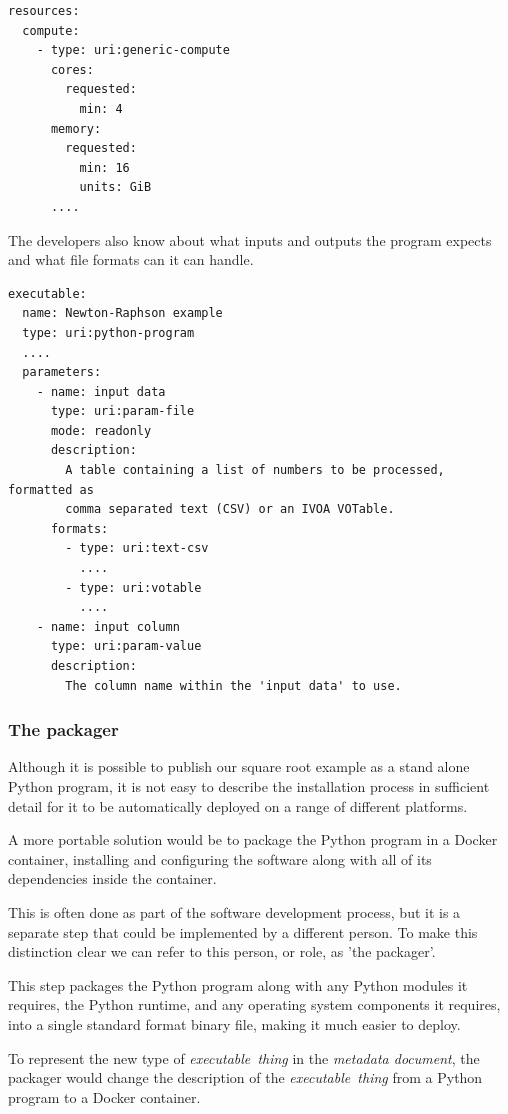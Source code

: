 \documentclass[11pt,a4paper]{ivoa}
\newcommand{\executablething}[1] {\textit{executable~thing#1}}
\newcommand{\metadoc} [1]{\textit{metadata document#1}}
\newcommand{\python} {Python}
\newcommand{\pythonprogram} {Python program}
\newcommand{\pythonruntime} {Python runtime}
\newcommand{\dockercontainer} {Docker container}
\begin{document}
\begin{lstlisting}[]
resources:
  compute:
    - type: uri:generic-compute
      cores:
        requested:
          min: 4
      memory:
        requested:
          min: 16
          units: GiB
      ....
\end{lstlisting}

The developers also know about what inputs and outputs the program expects and what file
formats can it can handle.

\begin{lstlisting}[]
executable:
  name: Newton-Raphson example
  type: uri:python-program
  ....
  parameters:
    - name: input data
      type: uri:param-file
      mode: readonly
      description:
        A table containing a list of numbers to be processed, formatted as
        comma separated text (CSV) or an IVOA VOTable.
      formats:
        - type: uri:text-csv
          ....
        - type: uri:votable
          ....
    - name: input column
      type: uri:param-value
      description:
        The column name within the 'input data' to use.
\end{lstlisting}

\subsubsection{The packager}
\label{software-packager}

Although it is possible to publish our square root example as a stand alone \pythonprogram{},
it is not easy to describe the installation process in sufficient detail for it to be
automatically deployed on a range of different platforms.

A more portable solution would be to package the \pythonprogram{} in a \dockercontainer{},
installing and configuring the software along with all of its dependencies inside the container.

This is often done as part of the software development process, but it is a separate
step that could be implemented by a different person.
To make this distinction clear we can refer to this person, or role, as 'the packager'.

This step packages the \pythonprogram{} along with any \python{} modules it requires,
the \pythonruntime{}, and any operating system components it requires, into a single
standard format binary file, making it much easier to deploy.

To represent the new type of \executablething{} in the \metadoc{}, the packager
would change the description of the \executablething{} from a \pythonprogram{}
to a \dockercontainer{}.
\end{document}
